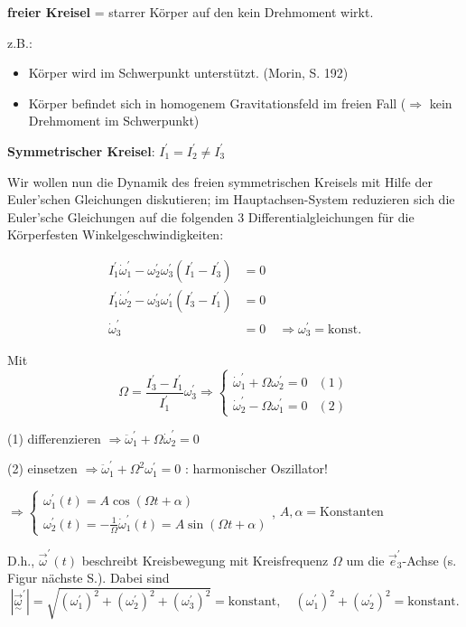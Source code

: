 \documentclass[10pt, letterpaper]{article}
\begin{document}
\textbf{freier Kreisel} = starrer Körper auf den kein Drehmoment wirkt.

z.B.: 
\begin{itemize}
\item Körper wird im Schwerpunkt unterstützt. (Morin, S. 192)
\item Körper befindet sich in homogenem Gravitationsfeld im freien Fall ($\Rightarrow$ kein Drehmoment im Schwerpunkt)
\end{itemize}

\textbf{Symmetrischer Kreisel}: $I_1^\prime = I_2^\prime \neq I_3^\prime$

Wir wollen nun die Dynamik des freien symmetrischen Kreisels mit Hilfe der Euler'schen Gleichungen diskutieren; im Hauptachsen-System reduzieren sich die Euler'sche Gleichungen auf die folgenden 3 Differentialgleichungen für die Körperfesten Winkelgeschwindigkeiten:

\begin{align*}
I_1^\prime \dot{\omega}_1^\prime - \omega_2^\prime \omega_3^\prime (I_1^\prime-I_3^\prime) &= 0 \\
I_1^\prime \dot{\omega}_2^\prime - \omega_3^\prime \omega_1^\prime (I_3^\prime-I_1^\prime) &= 0 \\
\dot{\omega}_3^\prime &= 0 \quad \Rightarrow \omega_3^\prime = \text{konst.}
\end{align*}

Mit 
$$\Omega = \frac{I_3^\prime-I_1^\prime}{I_1^\prime} \omega_3^\prime \Rightarrow \begin{cases} \dot{\omega}_1^\prime + \Omega \omega_2^\prime = 0 & (1) \\ \dot{\omega}_2^\prime - \Omega \omega_1^\prime = 0 & (2) \end{cases}$$

(1) differenzieren $\Rightarrow \ddot{\omega}_1^\prime + \Omega \dot{\omega}_2^\prime = 0$

(2) einsetzen $\Rightarrow \ddot{\omega}_1^\prime + \Omega^2 \omega_1^\prime = 0$ : harmonischer Oszillator!

$\Rightarrow \begin{cases} \omega_1^\prime(t) = A \cos(\Omega t + \alpha) \\ \omega_2^\prime(t) = -\frac{1}{\Omega}\dot{\omega}_1^\prime(t) = A \sin(\Omega t + \alpha) \end{cases}$, $A, \alpha = \text{Konstanten}$

D.h., $\vec{\omega}^\prime(t)$ beschreibt Kreisbewegung mit Kreisfrequenz $\Omega$ um die $\vec{e}_3^\prime$-Achse (s. Figur nächste S.). Dabei sind
\[|\vec{\underset{\sim}{\omega}}^\prime| = \sqrt{(\omega_1^\prime)^2+(\omega_2^\prime)^2+(\omega_3^\prime)^2} = \text{konstant}, \quad (\omega_1^\prime)^2+(\omega_2^\prime)^2 = \text{konstant}.\]
\end{document}
